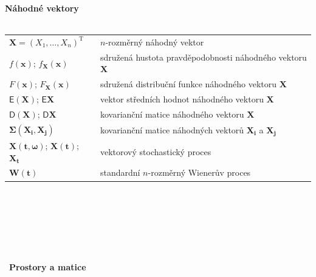 \documentclass[a4paper,12pt]{report}
\theoremstyle{definition} \newtheorem{definice}[veta]{Definice}
\theoremstyle{remark}
\begin{document}
%
%
\textbf{Náhodné vektory}\\\\
   \begin{tabular}{p{4cm} p{9.3cm}}
  $\boldsymbol{X}=(X_1,\dots,X_n)^\mathrm{T}$                 &     $n$-rozměrný náhodný vektor \\
  $f(\mathbf{x})$; $f_{\boldsymbol{X}}(\mathbf{x})$                                             &   sdružená hustota pravděpodobnosti náhodného vektoru  $\boldsymbol{X}$\\
   $F(\mathbf{x})$; $F_{\boldsymbol{X}}(\mathbf{x})$                                             &   sdružená distribuční funkce náhodného vektoru  $\boldsymbol{X}$\\
    $\mathsf{E}(\boldsymbol{X})$; $\mathsf{E}\boldsymbol{X}$                             &   vektor středních hodnot náhodného vektoru $\boldsymbol{X}$\\
   $\mathsf{D}(\boldsymbol{X})$; $\mathsf{D}\boldsymbol{X}$                             &   kovarianční matice náhodného vektoru $\boldsymbol{X}$\\
    $\boldsymbol{\Sigma}(\boldsymbol{X_i},\boldsymbol{X_j})$     &   kovarianční matice náhodných vektorů $\boldsymbol{X_i}$ a $\boldsymbol{X_j}$\\
$\boldsymbol{X}(\boldsymbol{t},\boldsymbol{\omega})$; $\boldsymbol{X}(\boldsymbol{t})$; $\boldsymbol{X}_{\boldsymbol{t}}$  				& vektorový stochastický proces\\
$\boldsymbol{W}(\boldsymbol{t})$ 		& standardní $n$-rozměrný Wienerův proces\\
   \end{tabular}\\\\\\
%
%
%
\\\\\\\
\textbf{Prostory a matice}\\\\
\end{document}
